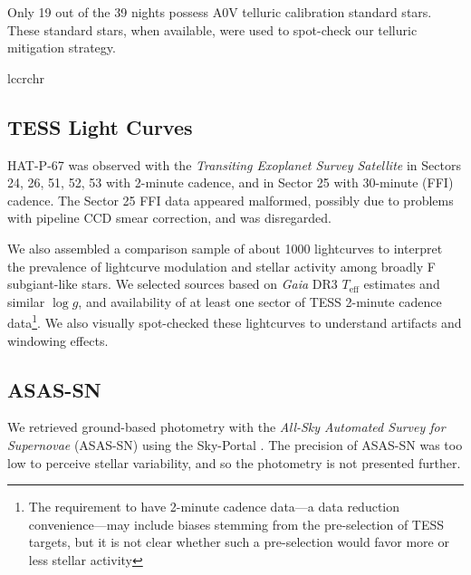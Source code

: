 \documentclass[twocolumn]{aastex631}
\begin{document}
Only 19 out of the 39 nights possess A0V telluric calibration standard stars.  These standard stars, when available, were used to spot-check our telluric mitigation strategy.


\begin{deluxetable}{lccrchr}
    \tablewidth{0pc}
    \tabletypesize{\scriptsize}
    \startdata
    
    \enddata
\end{deluxetable}

\subsection{TESS Light Curves}
HAT-P-67 was observed with the \emph{Transiting Exoplanet Survey Satellite} \citep[TESS,][]{2014SPIE.9143E..20R} in Sectors 24, 26, 51, 52, 53 with 2-minute cadence, and in Sector 25 with 30-minute (FFI) cadence.  The Sector 25 FFI data appeared malformed, possibly due to problems with pipeline CCD smear correction, and was disregarded.

We also assembled a comparison sample of about 1000 lightcurves to interpret the  prevalence of lightcurve modulation and stellar activity among broadly F subgiant-like stars.  We selected sources based on \emph{Gaia} DR3 $T_\mathrm{eff}$ estimates and similar $\log{g}$,  and availability of at least one sector of TESS 2-minute cadence data\footnote{The requirement to have 2-minute cadence data---a data reduction convenience---may include biases stemming from the pre-selection of TESS targets, but it is not clear whether such a pre-selection would favor more or less stellar activity}.  We also visually spot-checked these lightcurves to understand artifacts and windowing effects.

\subsection{ASAS-SN}
We retrieved ground-based photometry with the \emph{All-Sky Automated Survey for Supernovae} (ASAS-SN) using the Sky-Portal \citep{shappee14,2017PASP..129j4502K}.  The precision of ASAS-SN was too low to perceive stellar variability, and so the photometry is not presented further.
\end{document}
